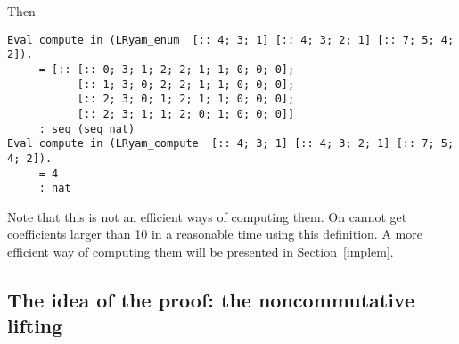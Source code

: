 \documentclass[12pt,a4paper]{article}
\begin{document}
Then
\begin{lstlisting}
Eval compute in (LRyam_enum  [:: 4; 3; 1] [:: 4; 3; 2; 1] [:: 7; 5; 4; 2]).
     = [:: [:: 0; 3; 1; 2; 2; 1; 1; 0; 0; 0];
           [:: 1; 3; 0; 2; 2; 1; 1; 0; 0; 0];
           [:: 2; 3; 0; 1; 2; 1; 1; 0; 0; 0];
           [:: 2; 3; 1; 1; 2; 0; 1; 0; 0; 0]]
     : seq (seq nat)
Eval compute in (LRyam_compute  [:: 4; 3; 1] [:: 4; 3; 2; 1] [:: 7; 5; 4; 2]).
     = 4
     : nat
\end{lstlisting}
Note that this is not an efficient ways of computing them. On cannot get
coefficients larger than 10 in a reasonable time using this definition. A more
efficient way of computing them will be presented in Section~\ref{implem}.

\subsection{The idea of the proof: the noncommutative lifting}
\end{document}
